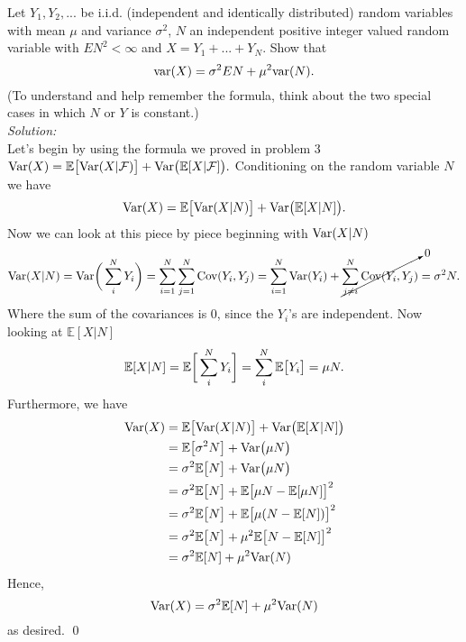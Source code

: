 \documentclass[10pt]{amsart}
\begin{document}
  Let $Y_1, Y_2, . . .$ be i.i.d. (independent and identically distributed) random variables with mean $\mu$ and variance $\sigma^2$, $N$ an independent positive integer valued random variable with $EN^2 < \infty$ and $X = Y_1 +...+Y_N$.
Show that
$${\rm var}(X) = \sigma^2 EN + \mu^2 {\rm var}(N).$$
(To understand and help remember the formula, think about the two special cases in which $N$ or $Y$ is constant.) \\
\textit{Solution:} \\
Let's begin by using the formula we proved in problem 3
$
{\rm Var}(X) = \mathbb E\big[{\rm Var}(X|\mathcal{F})\big] + {\rm Var}\big(\mathbb E[X|\mathcal{F}]\big).
$
Conditioning on the random variable $N$ we have
$$
{\rm Var}(X) = \mathbb E\big[{\rm Var}(X|N)\big] + {\rm Var}\big(\mathbb E[X | N]\big).
$$
Now we can look at this piece by piece beginning with ${\rm Var}(X | N)$
$$
{\rm Var}(X | N)
	= {\rm Var}\bigg(\sum_i^NY_i\bigg) \\
	= \sum_{i=1}^N\sum_{j = 1}^N {\rm Cov}(Y_i,Y_j) \\
	= \sum_{i=1}^N {\rm Var}(Y_i) + \cancelto{0}{\sum_{j \neq i}^N {\rm Cov}(Y_i,Y_j)} \\
	= \sigma^2N.
$$
Where the sum of the covariances is $0$, since the $Y_i$'s are independent.
Now looking at $\mathbb E[X | N]$
$$
\mathbb E[X | N] = \mathbb E \bigg[ \sum_i^NY_i\bigg] \\
	= \sum_i^N\mathbb E \big[ Y_i\big] \\
	= \mu N.
$$
Furthermore, we have
\begin{align*}
{\rm Var}(X) &= \mathbb E\big[{\rm Var}(X|N)\big] + {\rm Var}\big(\mathbb E[X | N]\big) \\
	&= \mathbb E\big[\sigma^2N\big] + {\rm Var}\big(\mu N\big) \\
	&= \sigma^2\mathbb E\big[N\big] + {\rm Var}\big(\mu N\big) \\
	&= \sigma^2\mathbb E\big[N\big] + \mathbb E \big[\mu N - \mathbb E [\mu N] \big]^2 \\
	&= \sigma^2\mathbb E\big[N\big] + \mathbb E \big[\mu (N - \mathbb E [N]) \big]^2 \\
	&= \sigma^2\mathbb E\big[N\big] + \mu^2 \mathbb E \big[ N - \mathbb E [N] \big]^2 \\
	&= \sigma^2\mathbb E[N] + \mu^2 {\rm Var}(N)
\end{align*}
Hence,
$${\rm Var}(X) = \sigma^2\mathbb E[N] + \mu^2 {\rm Var}(N)$$
as desired.
\qed \\
\end{document}
